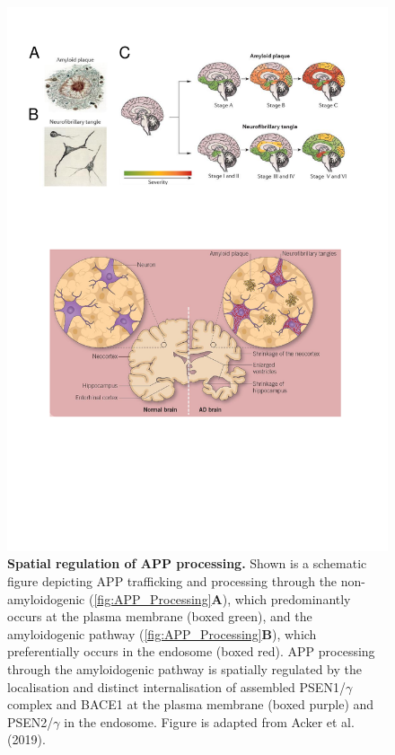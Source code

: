 \begin{figure}[!htp]
	\centering
	\includegraphics[page=6,trim={0 8cm 0cm 0cm},clip, scale = 0.7]{Figures/Introduction_Figures.pdf}
	\captionsetup{width=0.95\textwidth,singlelinecheck=off}
	\caption[Spatial regulation of APP trafficking and processing]%
	{\textbf{Spatial regulation of APP processing.} Shown is a schematic figure depicting APP trafficking and processing through the non-amyloidogenic (\cref{fig:APP_Processing}\textbf{A}), which predominantly occurs at the plasma membrane (boxed green), and the amyloidogenic pathway (\cref{fig:APP_Processing}\textbf{B}), which preferentially occurs in the endosome (boxed red). APP processing through the amyloidogenic pathway is spatially regulated by the localisation and distinct internalisation of assembled PSEN1/$\gamma$ complex and BACE1 at the plasma membrane (boxed purple) and PSEN2/$\gamma$ in the endosome. Figure is adapted from Acker et al. (2019)\cite{Acker2019}.  
	}
	\label{fig:APP_Trafficking}
\end{figure}

